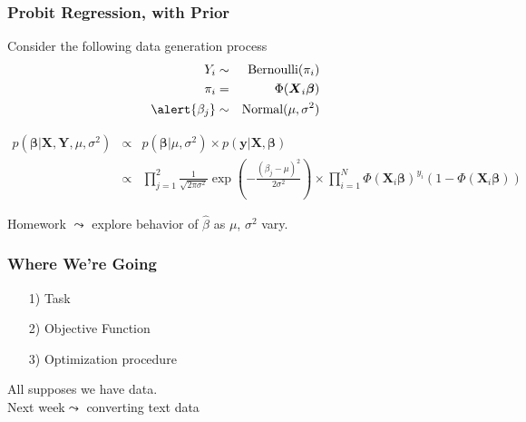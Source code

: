 \documentclass{beamer}
\numberwithin{equation}{section}
\begin{document}
\begin{frame}
\frametitle{Probit Regression, with Prior}

Consider the following data generation process
\begin{eqnarray}
Y_{i} & \sim & \text{Bernoulli}(\pi_{i} ) \nonumber \\
\pi_{i} & = & \Phi(\boldsymbol{X}_{i} \boldsymbol{\beta} ) \nonumber \\
\alert{\beta_{j}} & \sim & \text{Normal}(\mu, \sigma^2) \nonumber 
\end{eqnarray}

\small
\begin{eqnarray}
p(\boldsymbol{\beta}| \boldsymbol{X}, \boldsymbol{Y}, \mu, \sigma^2) & \propto & p(\boldsymbol{\beta} | \mu, \sigma^2) \times p(\boldsymbol{y} | \boldsymbol{X}, \boldsymbol{\beta} ) \nonumber \\
& \propto & \prod_{j=1}^{2} \frac{1}{\sqrt{2\pi \sigma^2} } \exp\left( -\frac{ ( \beta_{j} - \mu)^2}{2\sigma^2} \right) \times  \prod_{i=1}^{N} \Phi(\boldsymbol{X}_{i} \boldsymbol{\beta})^{y_{i}} (1 - \Phi(\boldsymbol{X}_{i} \boldsymbol{\beta} ) ) \nonumber 
\end{eqnarray}


\alert{Homework} $\leadsto$ explore behavior of $\widehat{\beta}$ as $\mu$, $\sigma^2$ vary.  




\end{frame}

\begin{frame}
\frametitle{Where We're Going}

\begin{itemize}
\item[1)] Task
\item[2)] Objective Function
\item[3)] Optimization procedure
\end{itemize}

All supposes we have data. \\
Next week$\leadsto$ converting text data



\end{frame}
\end{document}
